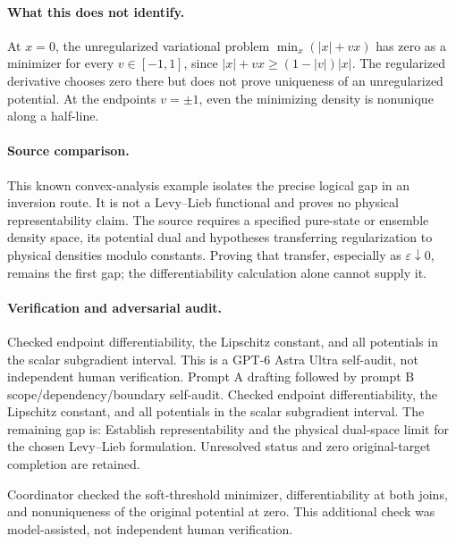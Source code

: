\documentclass[11pt]{article}
\begin{document}
\paragraph{What this does not identify.} At \(x=0\), the unregularized variational problem \(\min_x(|x|+vx)\) has zero as a minimizer for every \(v\in[-1,1]\), since \(|x|+vx\ge(1-|v|)|x|\). The regularized derivative chooses zero there but does not prove uniqueness of an unregularized potential. At the endpoints \(v=\pm1\), even the minimizing density is nonunique along a half-line.
\paragraph{Source comparison.} This known convex-analysis example isolates the precise logical gap in an inversion route. It is not a Levy--Lieb functional and proves no physical representability claim. The source requires a specified pure-state or ensemble density space, its potential dual and hypotheses transferring regularization to physical densities modulo constants. Proving that transfer, especially as \(\varepsilon\downarrow0\), remains the first gap; the differentiability calculation alone cannot supply it.

\paragraph{Verification and adversarial audit.}
Checked endpoint differentiability, the Lipschitz constant, and all potentials in the scalar subgradient interval. This is a GPT-6 Astra Ultra self-audit, not independent human verification. Prompt A drafting followed by prompt B scope/dependency/boundary self-audit. Checked endpoint differentiability, the Lipschitz constant, and all potentials in the scalar subgradient interval. The remaining gap is: Establish representability and the physical dual-space limit for the chosen Levy--Lieb formulation. Unresolved status and zero original-target completion are retained.

Coordinator checked the soft-threshold minimizer, differentiability at both joins, and nonuniqueness of the original potential at zero. This additional check was model-assisted, not independent human verification.
\end{document}
